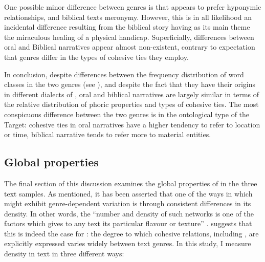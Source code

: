 \documentclass[output=paper
,modfonts
,nonflat]{langsci/langscibook}
\begin{document}
One possible minor difference between genres is that  appears to prefer hyponymic relationships, and biblical texts meronymy. However, this is in all likelihood an incidental difference resulting from the biblical story having as its main theme the miraculous healing of a physical handicap. Superficially, differences between oral and Biblical narratives appear almost non-existent, contrary to  expectation that genres differ in the types of cohesive ties they employ.

In conclusion, despite differences between the frequency distribution of word classes in the two genres (see ), and despite the fact that they have their origins in different dialects of , oral and biblical narratives are largely similar in terms of the relative distribution of phoric properties and types of cohesive ties. The most conspicuous difference between the two genres is in the ontological type of the Target: cohesive ties in oral narratives have a higher tendency to refer to location or time, biblical narrative tends to refer more to material entities.

\subsection{\label{s3.3}Global properties}

The final section of this discussion examines the global properties of  in the three  text samples. As mentioned, it has been asserted that one of the ways in which  might exhibit genre-dependent variation is through consistent differences in its density. In other words, the “number and density of such networks is one of the factors which gives to any text its particular flavour or texture” \citep[52]{Halliday1976}. \citet[187--193]{Biber1995} suggests that this is indeed the case for : the degree to which cohesive relations, including , are explicitly expressed varies widely between text genres. In this study, I measure density in  text in three different ways:
\end{document}
